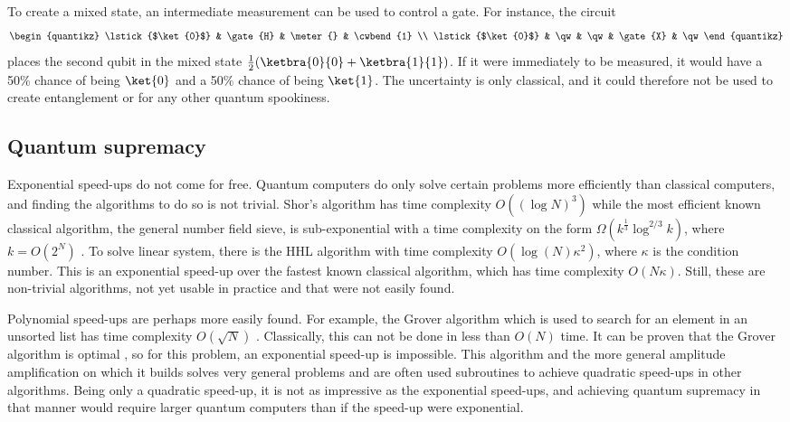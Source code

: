 To create a mixed state, an intermediate measurement can be used to control a gate.
For instance, the circuit
\begin{equation}
    \begin{quantikz}
        \lstick{$\ket{0}$} & \gate{H} & \meter{} & \cwbend{1} \\
        \lstick{$\ket{0}$} & \qw & \qw & \gate{X} & \qw
    \end{quantikz}
\end{equation}
places the second qubit in the mixed state $\frac{1}{2}(\ketbra{0}{0} + \ketbra{1}{1})$.
If it were immediately to be measured, it would have a 50\% chance of being $\ket{0}$ and a 50\% chance of being $\ket{1}$.
The uncertainty is only classical, and it could therefore not be used to create entanglement or for any other quantum spookiness.

\subsection{Quantum supremacy}
Exponential speed-ups do not come for free.
Quantum computers do only solve certain problems more efficiently than classical computers, and finding the algorithms to do so is not trivial.
Shor's algorithm has time complexity $O((\log N)^3)$ while the most efficient known classical algorithm, the general number field sieve, is sub-exponential with a time complexity on the form $\Omega(k^{\frac{1}{3}}\log^{2/3}k)$, where $k=O(2^N)$ \cite{dervovic2018}.
To solve linear system, there is the HHL algorithm with time complexity $O(\log(N)\kappa^2)$, where $\kappa$ is the condition number.
This is an exponential speed-up over the fastest known classical algorithm\footnotemark{}, which has time complexity $O(N \kappa)$.
Still, these are non-trivial algorithms, not yet usable in practice and that were not easily found.


Polynomial speed-ups are perhaps more easily found.
For example, the Grover algorithm which is used to search for an element in an unsorted list has time complexity $O(\sqrt{N})$ \cite{grover1996}.
Classically, this can not be done in less than $O(N)$ time.
It can be proven that the Grover algorithm is optimal \cite{zalka1999}, so for this problem, an exponential speed-up is impossible.
This algorithm and the more general amplitude amplification on which it builds solves very general problems and are often used subroutines to achieve quadratic speed-ups in other algorithms.
Being only a quadratic speed-up, it is not as impressive as the exponential speed-ups, and achieving quantum supremacy in that manner would require larger quantum computers than if the speed-up were exponential.


